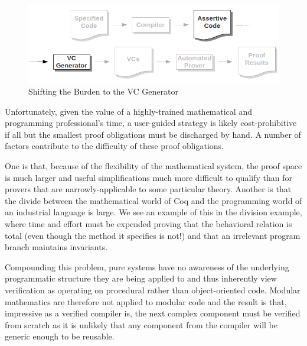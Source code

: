 \begin{figure}
  \centering
    \includegraphics[width=\textwidth]{vcpart}
  \caption{Shifting the Burden to the VC Generator\label{fig:assertivecode}}
\end{figure}

Unfortunately, given the value of a highly-trained mathematical and programming professional's time, a user-guided strategy is likely cost-prohibitive if all but the smallest proof obligations must be discharged by hand.  A number of factors contribute to the difficulty of these proof obligations.

One is that, because of the flexibility of the mathematical system, the proof space is much larger and useful simplifications much more difficult to qualify than for provers that are narrowly-applicable to some particular theory.  Another is that the divide between the mathematical world of Coq and the programming world of an industrial language is large.  We see an example of this in the division example, where time and effort must be expended proving that the behavioral relation is total (even though the method it specifies is not!) and that an irrelevant program branch maintains invariants.

Compounding this problem, pure systems have no awareness of the underlying programmatic structure they are being applied to and thus inherently view verification as operating on procedural rather than object-oriented code.  Modular mathematics are therefore not applied to modular code and the result is that, impressive as a verified compiler is, the next complex component must be verified from scratch as it is unlikely that any component from the compiler will be generic enough to be reusable.

